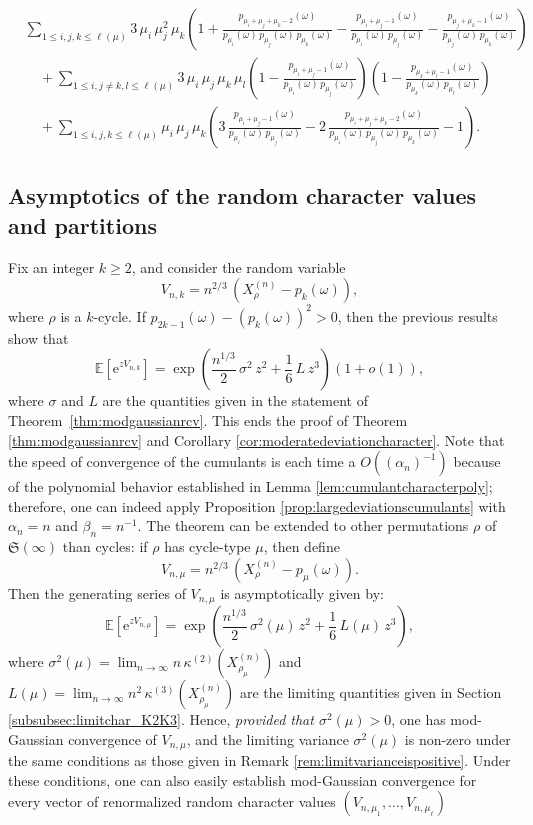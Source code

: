 \documentclass[12pt,a4paper,reqno]{amsart}
\theoremstyle{remark}
\newcommand{\E}{\mathrm{e}}
\newcommand{\esper}{\mathbb{E}}
\newcommand{\SubGraph}{X^{(n)}}
\newcommand{\sym}{\mathfrak{S}}
\begin{document}
\begin{align*}&\sum_{1 \leq  i,j,k \leq \ell(\mu)} 3\,\mu_{i}\,\mu_{j}^{2}\,\mu_{k}\left(1+\frac{p_{\mu_{i}+\mu_{j}+\mu_{k}-2}(\omega)}{p_{\mu_{i}}(\omega)\,p_{\mu_{j}}(\omega)\,p_{\mu_{k}}(\omega)}-\frac{p_{\mu_{i}+\mu_{j}-1}(\omega)}{p_{\mu_{i}}(\omega)\,p_{\mu_{j}}(\omega)}-\frac{p_{\mu_{j}+\mu_{k}-1}(\omega)}{p_{\mu_{j}}(\omega)\,p_{\mu_{k}}(\omega)}\right)\\
&\quad+\sum_{1\leq i,j\neq k,l \leq \ell(\mu)}3\,\mu_{i}\,\mu_{j}\,\mu_{k}\,\mu_{l}\left( 1- \frac{p_{\mu_{i}+\mu_{j}-1}(\omega)}{p_{\mu_{i}}(\omega)\,p_{\mu_{j}}(\omega)}\right)\left(1 - \frac{p_{\mu_{k}+\mu_{l}-1}(\omega)}{p_{\mu_{k}}(\omega)\,p_{\mu_{l}}(\omega)}\right) \\
&\quad+\sum_{1 \leq  i,j,k \leq \ell(\mu)} \mu_{i}\,\mu_{j}\,\mu_{k}\left(3\,\frac{p_{\mu_{i}+\mu_{j}-1}(\omega)}{p_{\mu_{i}}(\omega)\,p_{\mu_{j}}(\omega)}-2\,\frac{p_{\mu_{i}+\mu_{j}+\mu_{k}-2}(\omega)}{p_{\mu_{i}}(\omega)\,p_{\mu_{j}}(\omega)\,p_{\mu_{k}}(\omega)}-1\right).\end{align*}
\bigskip



\subsection{Asymptotics of the random character values and partitions}\label{subsec:asymptoticrcv}
Fix an integer $k \ge 2$, and consider the random variable
$$V_{n,k}=n^{2/3}\,(\SubGraph_{\rho}-p_{k}(\omega)),$$ 
where $\rho$ is a $k$-cycle. If $p_{2k-1}(\omega)-(p_{k}(\omega))^{2}>0$, then the previous results show that  
$$\esper[\E^{zV_{n,k}}]=\exp\left(\frac{n^{1/3}}{2}\,\sigma^2\,z^2 + \frac{1}{6} \,L \,z^3\right)
(1+o(1))\!,$$ 
where $\sigma$ and $L$ are the quantities given in the statement of Theorem~\ref{thm:modgaussianrcv}.
This ends the proof of Theorem \ref{thm:modgaussianrcv} and Corollary \ref{cor:moderatedeviationcharacter}. Note that the speed of convergence of the cumulants is each time a $O((\alpha_{n})^{-1})$ because of the polynomial behavior established in Lemma \ref{lem:cumulantcharacterpoly}; therefore, one can indeed apply Proposition \ref{prop:largedeviationscumulants} with $\alpha_{n}=n$ and $\beta_{n}=n^{-1}$. The theorem can be extended to other permutations $\rho$ of $\sym(\infty)$
than cycles: if $\rho$ has cycle-type $\mu$, then define
\[V_{n,\mu} = n^{2/3}\,(\SubGraph_{\rho}-p_{\mu}(\omega)).\]
Then the  generating series of $V_{n,\mu}$ is asymptotically given by:
$$\esper[\E^{zV_{n,\mu}}]=\exp\left(\frac{n^{1/3}}{2}\,\sigma^2(\mu)\,z^2 + \frac{1}{6} \,L(\mu) \,z^3\right)\!,$$ 
where $\sigma^2(\mu)=\lim_{n \to \infty}n\,\kappa^{(2)}(\SubGraph_{\rho_{\mu}})$ and $L(\mu)=\lim_{n \to \infty}n^{2}\,\kappa^{(3)}(\SubGraph_{\rho_{\mu}})$ are the limiting quantities given in Section \ref{subsubsec:limitchar_K2K3}.
Hence, \emph{provided that $\sigma^{2}(\mu)>0$}, one has mod-Gaussian convergence of $V_{n,\mu}$, and the limiting variance $\sigma^{2}(\mu)$ is non-zero under the same conditions as those given in Remark \ref{rem:limitvarianceispositive}. Under these conditions, one can also easily establish mod-Gaussian convergence for every vector of 
renormalized random character values $(V_{n,\mu_1},\dots, V_{n,\mu_\ell})$
\bigskip
\end{document}
